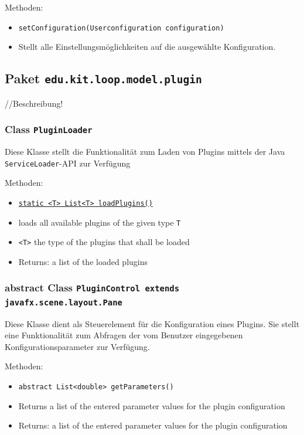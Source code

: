 \documentclass[parskip=full,11pt]{scrartcl}
\begin{document}
Methoden:
\begin{itemize}\itemsep -10pt
\item \texttt{setConfiguration(Userconfiguration configuration)}
\item[] Stellt alle Einstellungsmöglichkeiten auf die ausgewählte Konfiguration.
\end{itemize}

\subsection{Paket \texttt{edu.kit.loop.model.plugin}}
//Beschreibung!

\subsubsection{Class \texttt{PluginLoader}}

Diese Klasse stellt die Funktionalität zum Laden von Plugins mittels der Java \texttt{ServiceLoader}-API zur Verfügung

Methoden:

\begin{itemize}\itemsep -10pt
	\item \underline{\texttt{static <T> List<T> loadPlugins()}}
	\item[] loads all available plugins of the given type \texttt{T}
	\item[] \texttt{<T>} the type of the plugins that shall be loaded
	\item[]Returns: a list of the loaded plugins
\end{itemize}

\subsubsection{abstract Class \texttt{PluginControl extends javafx.scene.layout.Pane}}

Diese Klasse dient als Steuerelement für die Konfiguration eines Plugins. Sie stellt eine Funktionalität zum Abfragen der vom Benutzer eingegebenen Konfigurationsparameter zur Verfügung.

Methoden:

\begin{itemize}\itemsep -10pt
	\item \texttt{abstract List<double> getParameters()}
	\item[] Returns a list of the entered parameter values for the plugin configuration
	\item[] Returns: a list of the entered parameter values for the plugin configuration
\end{itemize}
\end{document}
